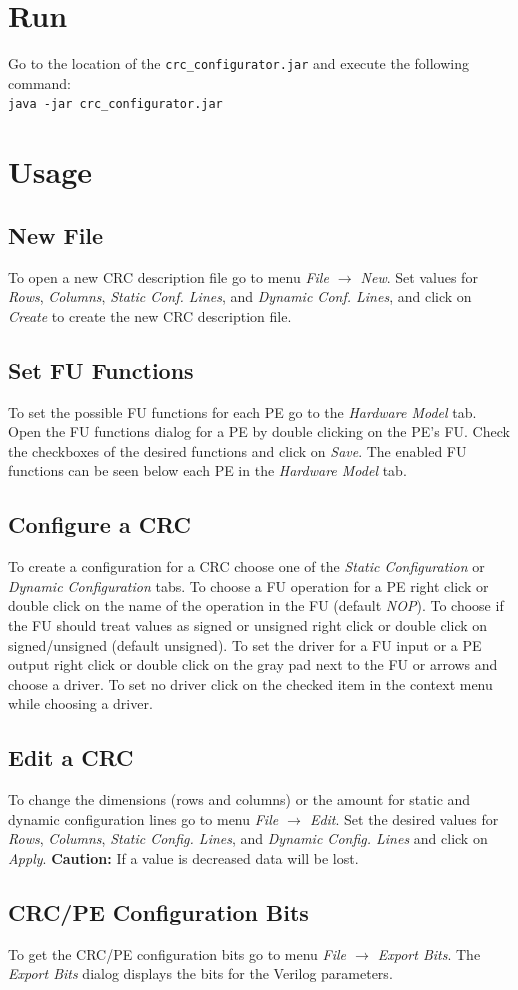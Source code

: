 \documentclass{article}
\begin{document}
\section*{Run}
Go to the location of the \texttt{crc\_configurator.jar} and execute the following command:\\[2mm]
\texttt{java -jar crc\_configurator.jar}\\[2mm]

\section*{Usage}
\subsection*{New File}

To open a new CRC description file go to menu \textit{File $\rightarrow$ New}. Set values for \textit{Rows}, \textit{Columns}, \textit{Static Conf. Lines}, and \textit{Dynamic Conf. Lines}, and click on \textit{Create} to create the new CRC description file.
\subsection*{Set FU Functions}

To set the possible FU functions for each PE go to the \textit{Hardware Model} tab. Open the FU functions dialog for a PE by double clicking on the PE's FU. Check the checkboxes of the desired functions and click on \textit{Save}. The enabled FU functions can be seen below each PE in the \textit{Hardware Model} tab.

\subsection*{Configure a CRC}
To create a configuration for a CRC choose one of the \textit{Static Configuration} or \textit{Dynamic Configuration} tabs. To choose a FU operation for a PE right click or double click on the name of the operation in the FU (default \textit{NOP}). To choose  if the FU should treat values as signed or unsigned right click or double click on signed/unsigned (default unsigned). To set the driver for a FU input or a PE output right click or double click on the gray pad next to the FU or arrows and choose a driver. To set no driver click on the checked item in the context menu while choosing a driver.

\subsection*{Edit a CRC}
To change the dimensions (rows and columns) or the amount for static and dynamic configuration lines go to menu \textit{File $\rightarrow$ Edit}. Set the desired values for \textit{Rows}, \textit{Columns}, \textit{Static Config. Lines}, and \textit{Dynamic Config. Lines} and click on \textit{Apply}. \textbf{Caution:} If a value is decreased data will be lost.

\subsection*{CRC/PE Configuration Bits}
To get the CRC/PE configuration bits go to menu \textit{File $\rightarrow$ Export Bits}. The \textit{Export Bits} dialog displays the bits for the Verilog parameters.
\end{document}
